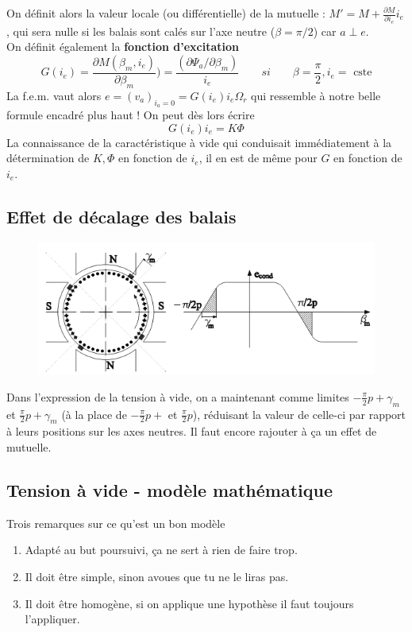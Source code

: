 		On définit alors la valeur locale (ou différentielle) de la 
		mutuelle : $\displaystyle M' = M+\frac{\partial M}{\partial 
		i_e}i_e$, qui sera nulle si les balais sont calés sur l'axe 
		neutre ($\beta = \pi/2$) car $a \perp e$. \\
		On définit également la \textbf{fonction d'excitation}
		\begin{equation}
		G(i_e) = \frac{\partial M(\beta_m,i_e)}{\partial \beta_m}) =
		\frac{(\partial \Psi_a/\partial \beta_m)}{i_e}\qquad si\qquad 
		\beta=\frac{\pi}{2}, i_e=\text{ cste}
		\end{equation}
		La f.e.m. vaut alors $e = (v_a)_{i_a=0} = G(i_e)i_e\Omega_r$ 
		qui ressemble à notre belle formule encadré plus haut ! On 
		peut dès lors écrire
		\begin{equation}
		G(i_e)i_e = K\Phi
		\end{equation}
		La connaissance de la caractéristique à vide qui conduisait 
		immédiatement à la détermination de $K, \Phi$ en fonction de 
		$i_e$, il en est de même pour $G$ en fonction de $i_e$.
		
	\subsection{Effet de décalage des balais}
	\begin{figure}
	\vspace{-8mm}
	\includegraphics[scale=0.5]{ch4/image8.png}
	\end{figure}
	Dans l'expression de la tension à vide, on a maintenant comme 
	limites $-\frac{\pi}{2}p+\gamma_m$ et $\frac{\pi}{2}p+\gamma_m$ (à 
	la place de $-\frac{\pi}{2}p+$ et $\frac{\pi}{2}p$), réduisant la 
	valeur de celle-ci par rapport à leurs positions sur les axes neutres. 
	Il faut encore rajouter à ça un effet de mutuelle.
	
	\subsection{Tension à vide - modèle mathématique}
	Trois remarques sur ce qu'est un bon modèle
	\begin{enumerate}
	\item Adapté au but poursuivi, ça ne sert à rien de faire trop.
	\item Il doit être simple, sinon avoues que tu ne le liras pas.
	\item Il doit être homogène, si on applique une hypothèse il faut 
	toujours l'appliquer.
	\end{enumerate}\ \\
	
